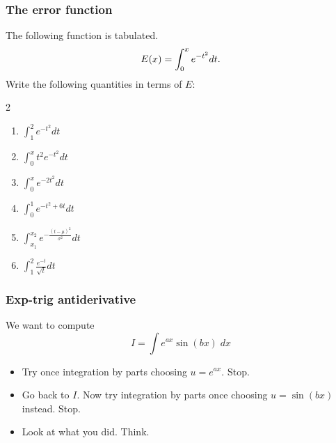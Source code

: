 \documentclass[14pt]{beamer}
\begin{document}
\begin{frame}[t]
	\frametitle{The error function}

	The following function is tabulated.
	\[
		{\Large E(x) = \int_0^x e^{-t^2} dt}.
	\]
	Write the following quantities in terms of $E$:

	\begin{multicols}{2}
		\begin{enumerate}
			\item $\displaystyle \int_{1}^{2}e^{-t^2}dt$

				\vspace{.2cm}

			\item $\displaystyle \int_{0}^{x}t^{2}e^{-t^2}dt$

				\vspace{.2cm}

			\item $\displaystyle \int_{0}^{x}e^{-2t^2}dt$

				\vspace{.2cm}

			\item $\displaystyle \int_{0}^{1}e^{-t^2+6t}dt$

				\vspace{.2cm}

			\item $\displaystyle \int_{x_1}^{x_2}e^{-\frac{(t- \mu)^{2}}{\sigma^{2}}}dt$

				\vspace{.2cm}

			\item $\displaystyle \int_{1}^{2}\frac{e^{-t}}{\sqrt{t}}dt$
		\end{enumerate}
	\end{multicols}
\end{frame}

\begin{frame}[t]
	\frametitle{Exp-trig antiderivative}

	We want to compute
	\[
		I = \int e^{ax}\sin (bx) \; dx
	\]
	\begin{itemize}
		\item Try once integration by parts choosing $\displaystyle u = e^{ax}$.
			Stop.

		\item Go back to $I$. Now try integration by parts once choosing
			$\displaystyle u = \sin (bx)$ instead. Stop.

		\item Look at what you did. Think.
	\end{itemize}
\end{frame}
\end{document}
